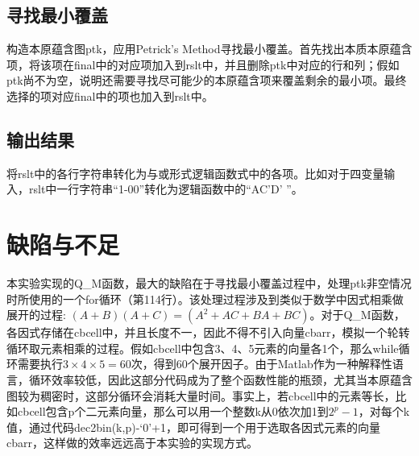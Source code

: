 \documentclass[12pt, a4paper, titlepage]{article}
\begin{document}
		\subsection{寻找最小覆盖}
		构造本原蕴含图ptk，应用Petrick's Method寻找最小覆盖。首先找出本质本原蕴含项，将该项在final中的对应项加入到rslt中，并且删除ptk中对应的行和列；假如ptk尚不为空，说明还需要寻找尽可能少的本原蕴含项来覆盖剩余的最小项。最终选择的项对应final中的项也加入到rslt中。
		\subsection{输出结果}
		将rslt中的各行字符串转化为与或形式逻辑函数式中的各项。比如对于四变量输入，rslt中一行字符串``1-00''转化为逻辑函数中的``AC'D' ''。
	\section{缺陷与不足}
	本实验实现的Q\_M函数，最大的缺陷在于寻找最小覆盖过程中，处理ptk非空情况时所使用的一个for循环（第114行）。该处理过程涉及到类似于数学中因式相乘做展开的过程: $(A+B)(A+C)=(A^2+AC+BA+BC)$。对于Q\_M函数，各因式存储在cbcell中，并且长度不一，因此不得不引入向量cbarr，模拟一个轮转循环取元素相乘的过程。假如cbcell中包含3、4、5元素的向量各1个，那么while循环需要执行$3\times 4\times 5=60$次，得到60个展开因子。由于Matlab作为一种解释性语言，循环效率较低，因此这部分代码成为了整个函数性能的瓶颈，尤其当本原蕴含图较为稠密时，这部分循环会消耗大量时间。事实上，若cbcell中的元素等长，比如cbcell包含p个二元素向量，那么可以用一个整数k从0依次加1到$2^p-1$，对每个k值，通过代码dec2bin(k,p)-`0'+1，即可得到一个用于选取各因式元素的向量cbarr，这样做的效率远远高于本实验的实现方式。
\end{document}
